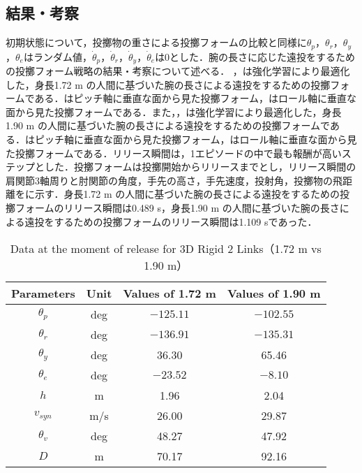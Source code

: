 \subsection{結果・考察}
初期状態について，投擲物の重さによる投擲フォームの比較と同様に$\theta_{p}$，$\theta_{r}$，$\theta_{y}$，$\theta_{e}$はランダム値，$\dot{\theta}_{p}$，$\dot{\theta}_{r}$，$\dot{\theta}_{y}$，$\dot{\theta}_{e}$は0とした．腕の長さに応じた遠投をするための投擲フォーム戦略の結果・考察について述べる．
，は強化学習により最適化した，身長1.72 m の人間に基づいた腕の長さによる遠投をするための投擲フォームである．はピッチ軸に垂直な面から見た投擲フォーム，はロール軸に垂直な面から見た投擲フォームである．また，，は強化学習により最適化した，身長1.90 m の人間に基づいた腕の長さによる遠投をするための投擲フォームである．はピッチ軸に垂直な面から見た投擲フォーム，はロール軸に垂直な面から見た投擲フォームである．リリース瞬間は，1エピソードの中で最も報酬が高いステップとした．投擲フォームは投擲開始からリリースまでとし，リリース瞬間の肩関節3軸周りと肘関節の角度，手先の高さ，手先速度，投射角，投擲物の飛距離をに示す．身長1.72 m の人間に基づいた腕の長さによる遠投をするための投擲フォームのリリース瞬間は0.489 s，身長1.90 m の人間に基づいた腕の長さによる遠投をするための投擲フォームのリリース瞬間は1.109 sであった．

\begin{table}[tb]
  \begin{center}
    \caption{Data at the moment of release for 3D Rigid 2 Links（1.72 m vs 1.90 m）}
    \begin{tabular}{c|c|c|c}
      \hline
      Parameters & Unit & Values of 1.72 m & Values of 1.90 m \\
      \hline
      $\theta_{p}$ & deg & $-125.11$ & $-102.55$ \\
      $\theta_{r}$ & deg & $-136.91$ & $-135.31$ \\
      $\theta_{y}$ & deg  & 36.30 & 65.46 \\
      $\theta_{e}$ & deg & $-23.52$ & $-8.10$ \\
      $h$ & m & 1.96 & 2.04 \\
      $v_{syn}$ & m/s & 26.00 & 29.87 \\
      $\theta_{v}$ & deg & 48.27 & 47.92 \\
      $D$ & m & 70.17 & 92.16 \\
      \hline
    \end{tabular}
  \end{center}
\end{table}

